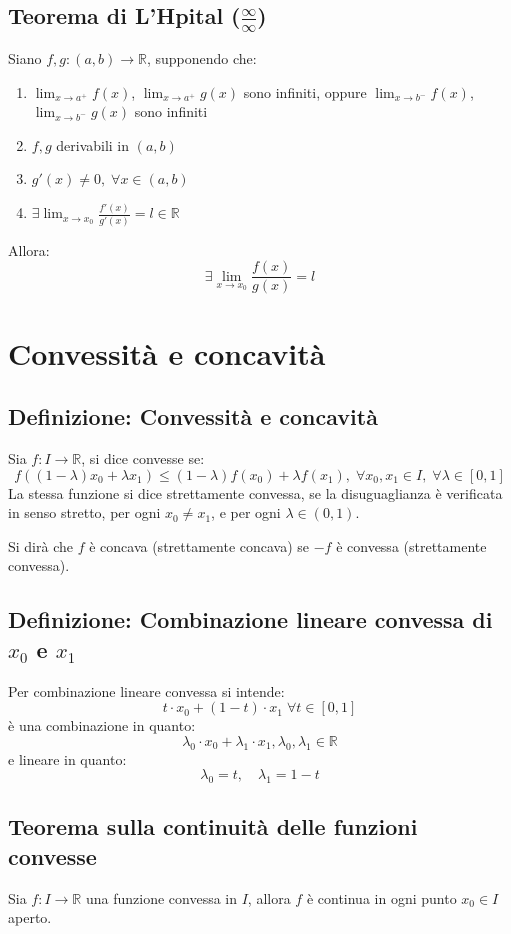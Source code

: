 \documentclass[a4paper,12pt,openright]{book}
\begin{document}
	\section{Teorema di L'Hpital ($\frac{\infty}{\infty}$)}
	Siano $f, g: (a, b) \longrightarrow \mathbb{R}$, supponendo che:
	\begin{enumerate}[label=\roman*)]
		\item $\lim_{x \rightarrow a^+} f(x)$, $\lim_{x \rightarrow a^+} g(x)$ sono infiniti, oppure $\lim_{x \rightarrow b^-} f(x)$, $\lim_{x \rightarrow b^-} g(x)$ sono infiniti
		\item $f, g$ derivabili in $(a, b)$
		\item $g'(x) \not = 0, \; \forall x \in (a, b)$
		\item $\exists \lim_{x \rightarrow x_0} \frac{f'(x)}{g'(x)} = l \in \mathbb{R}$
	\end{enumerate}
	Allora:
	\[\exists \lim_{x \rightarrow x_0} \frac{f(x)}{g(x)} = l\]
	
	\chapter{Convessità e concavità}
	\section{Definizione: Convessità e concavità}
	Sia $f: I \longrightarrow \mathbb{R}$, si dice convesse se:
	\[f((1-\lambda)x_0 + \lambda x_1) \leq (1 - \lambda)f(x_0) + \lambda f(x_1), \; \forall x_0, x_1 \in I, \; \forall \lambda \in [0, 1]\]
	La stessa funzione si dice strettamente convessa, se la disuguaglianza è verificata in senso stretto, per ogni $x_0 \not = x_1$, e per ogni $\lambda \in (0, 1)$.
	
	Si dirà che $f$ è concava (strettamente concava) se $-f$ è convessa (strettamente convessa).
	
	\section{Definizione: Combinazione lineare convessa di $x_0$ e $x_1$}
	Per combinazione lineare convessa si intende:
	\[t \cdot x_0 + (1 - t) \cdot x_1\;  \forall t \in [0, 1]\]
	è una combinazione in quanto:
	\[\lambda_0 \cdot x_0 + \lambda_1 \cdot x_1, \lambda_0, \lambda_1 \in \mathbb{R}\]
	e lineare in quanto:
	\[\lambda_0 = t, \quad \lambda_1 = 1 - t\]
	
	\section{Teorema sulla continuità delle funzioni convesse}
	Sia $f: I \longrightarrow \mathbb{R}$ una funzione convessa in $I$, allora $f$ è continua in ogni punto $x_0 \in I$ aperto.
	
\end{document}

